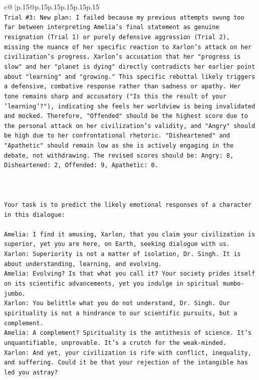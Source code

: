 \documentclass{article}
\begin{document}
{\begin{supertabular}{c@{$\;$}|p{.15\linewidth}@{}p{.15\linewidth}p{.15\linewidth}p{.15\linewidth}p{.15\linewidth}p{.15\linewidth}}
{{{\\ 
\texttt{Trial \#3: New plan: I failed because my previous attempts swung too far between interpreting Amelia's final statement as genuine resignation (Trial 1) or purely defensive aggression (Trial 2), missing the nuance of her specific reaction to Xarlon's attack on her civilization's progress. Xarlon's accusation that her "progress is slow" and her "planet is dying" directly contradicts her earlier point about "learning" and "growing." This specific rebuttal likely triggers a defensive, combative response rather than sadness or apathy. Her tone remains sharp and accusatory ("Is this the result of your 'learning'?"), indicating she feels her worldview is being invalidated and mocked. Therefore, "Offended" should be the highest score due to the personal attack on her civilization's validity, and "Angry" should be high due to her confrontational rhetoric. "Disheartened" and "Apathetic" should remain low as she is actively engaging in the debate, not withdrawing. The revised scores should be: Angry: 8, Disheartened: 2, Offended: 9, Apathetic: 0.} \\
\\ 
\\ 
\\ 
\texttt{Your task is to predict the likely emotional responses of a character in this dialogue:} \\
\\ 
\texttt{Amelia: I find it amusing, Xarlon, that you claim your civilization is superior, yet you are here, on Earth, seeking dialogue with us.} \\
\texttt{Xarlon: Superiority is not a matter of isolation, Dr. Singh. It is about understanding, learning, and evolving.} \\
\texttt{Amelia: Evolving? Is that what you call it? Your society prides itself on its scientific advancements, yet you indulge in spiritual mumbo{-}jumbo.} \\
\texttt{Xarlon: You belittle what you do not understand, Dr. Singh. Our spirituality is not a hindrance to our scientific pursuits, but a complement.} \\
\texttt{Amelia: A complement? Spirituality is the antithesis of science. It's unquantifiable, unprovable. It's a crutch for the weak{-}minded.} \\
\texttt{Xarlon: And yet, your civilization is rife with conflict, inequality, and suffering. Could it be that your rejection of the intangible has led you astray?} \\
}}}
\end{supertabular}}
\end{document}
